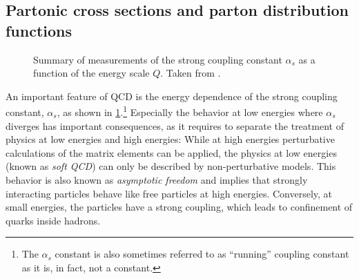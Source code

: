 \subsection{Partonic cross sections and parton distribution functions}
\label{subsec:factorisation}

\begin{figure}
  \caption[Summary of measurements of the strong coupling constant $\alpha_s$ as a function of the energy scale $Q$.]{Summary of measurements of the strong coupling constant $\alpha_s$ as a function of the energy scale $Q$. Taken from . }
  \label{fig:alphas}
\end{figure}


An important feature of QCD is the energy dependence of the strong coupling constant, $\alpha_s$, as shown in \cref{fig:alphas}.\footnote{The $\alpha_s$ constant is also sometimes referred to as ``running'' coupling constant as it is, in fact, not a constant.} 
Especially the behavior at low energies where $\alpha_s$ diverges has important consequences, as it requires to separate the treatment of physics at low energies and high energies: While at high energies perturbative calculations of the matrix elements can be applied, the physics at low energies (known as \emph{soft QCD}) can only be described by non-perturbative models.
This behavior is also known as \emph{asymptotic freedom} and implies that strongly interacting particles behave like free particles at high energies. Conversely, at small energies, the particles have a strong coupling, which leads to confinement of quarks inside hadrons.



